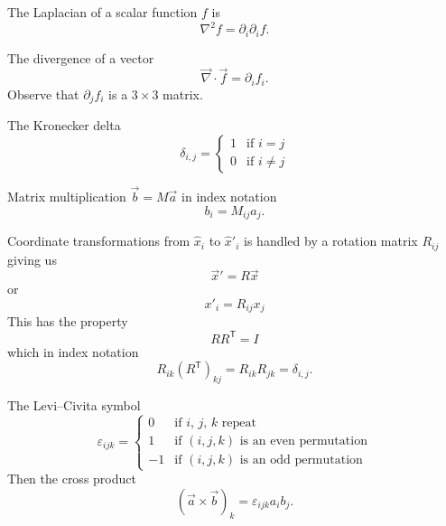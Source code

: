 \begin{example}
The Laplacian of a scalar function $f$ is
\begin{equation}
\nabla^{2}f = \partial_{i}\partial_{i}f.
\end{equation}
\end{example}

\begin{example}
The divergence of a vector
\begin{equation}
\vec{\nabla}\cdot\vec{f}=\partial_{i}f_{i}.
\end{equation}
Observe that $\partial_{j}f_{i}$ is a $3\times3$ matrix.
\end{example}

\begin{example}
The Kronecker delta
\begin{equation}
\delta_{i,j} = \begin{cases}1 & \mbox{if }i=j\\
0 & \mbox{if }i\neq j
\end{cases}
\end{equation}
\end{example}

\begin{example}
Matrix multiplication $\vec{b}=M\vec{a}$ in index notation
\begin{equation}
b_{i}=M_{ij}a_{j}.
\end{equation}
\end{example}

\begin{example}
Coordinate transformations from $\widehat{x}_{i}$ to $\widehat{x}'_{i}$
is handled by a rotation matrix $R_{ij}$ giving us
\begin{equation}
\vec{x}'=R\vec{x}
\end{equation}
or
\begin{equation}
x'_{i}=R_{ij}x_{j}
\end{equation}
This has the property
\begin{equation}
RR^{\mathsf{T}}=I
\end{equation}
which in index notation
\begin{equation}
R_{ik}(R^{\mathsf{T}})_{kj}=R_{ik}R_{jk}=\delta_{i,j}.
\end{equation}
\end{example}

\begin{example}
The Levi--Civita symbol
\begin{equation}
\varepsilon_{ijk} = \begin{cases}
  0 & \mbox{if $i$, $j$, $k$ repeat}\\
  1 & \mbox{if $(i,j,k)$ is an even permutation}\\
  -1 & \mbox{if $(i,j,k)$ is an odd permutation}
\end{cases}
\end{equation}
Then the cross product
\begin{equation}
(\vec{a}\times\vec{b})_{k}=\varepsilon_{ijk}a_{i}b_{j}.
\end{equation}
\end{example}

